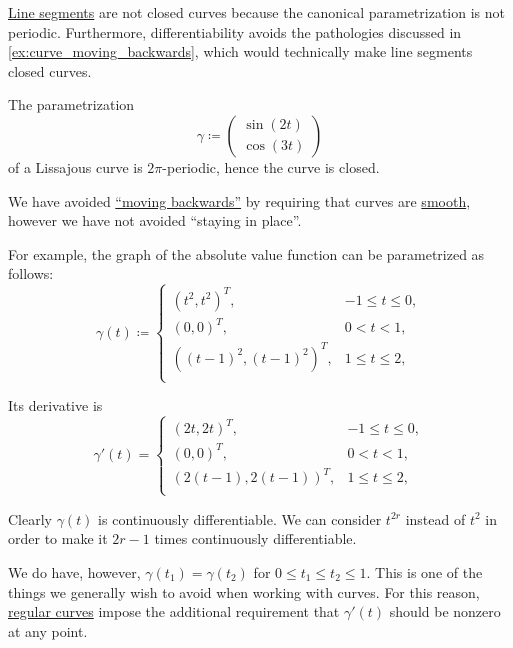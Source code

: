 \begin{example}\label{ex:def:closed_curve}
  \hfill
  \begin{thmenum}
     \hyperref[def:line_segment]{Line segments} are not closed curves because the canonical parametrization is not periodic. Furthermore, differentiability avoids the pathologies discussed in \cref{ex:curve_moving_backwards}, which would technically make line segments closed curves.

     The parametrization
    \begin{equation*}
      \gamma \coloneqq \begin{pmatrix} \sin(2t) \\ \cos(3t) \end{pmatrix}
    \end{equation*}
    of a Lissajous curve is \( 2\pi \)-periodic, hence the curve is closed.
  \end{thmenum}
\end{example}

\begin{example}\label{ex:curve_staying_in_place}
  We have avoided \hyperref[ex:curve_moving_backwards]{\enquote{moving backwards}} by requiring that curves are \hyperref[def:smooth_curve]{smooth}, however we have not avoided \enquote{staying in place}.

  For example, the graph of the absolute value function can be parametrized as follows:
  \begin{equation*}
    \gamma(t) \coloneqq \begin{cases}
      ( t^2     , t^2 )^T,     &-1 \leq t \leq 0, \\
      ( 0       , 0 )^T,       &0 < t < 1, \\
      ( (t-1)^2 , (t-1)^2 )^T, &1 \leq t \leq 2, \\
    \end{cases}
  \end{equation*}

  Its derivative is
  \begin{equation*}
    \gamma'(t) = \begin{cases}
      ( 2t     , 2t )^T,     &-1 \leq t \leq 0, \\
      ( 0      , 0 )^T,      &0 < t < 1, \\
      ( 2(t-1) , 2(t-1) )^T, &1 \leq t \leq 2, \\
    \end{cases}
  \end{equation*}

  Clearly \( \gamma(t) \) is continuously differentiable. We can consider \( t^{2r} \) instead of \( t^2 \) in order to make it \( 2r - 1 \) times continuously differentiable.

  We do have, however, \( \gamma(t_1) = \gamma(t_2) \) for \( 0 \leq t_1 \leq t_2 \leq 1 \). This is one of the things we generally wish to avoid when working with curves. For this reason, \hyperref[def:regular_curve]{regular curves} impose the additional requirement that \( \gamma'(t) \) should be nonzero at any point.
\end{example}

